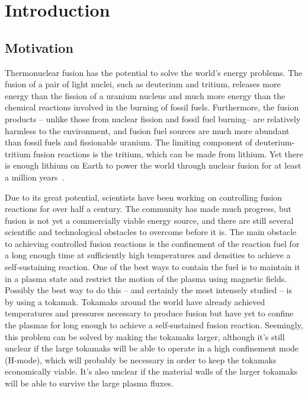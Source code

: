 \chapter{Introduction}
\label{c_intro}

\section{Motivation}
\label{s_motivation}

Thermonuclear fusion has the potential to solve the world's energy problems. The fusion of a pair of light nuclei, such as deuterium and tritium, releases more energy than the fission
of a uranium nucleus and much more energy than the chemical reactions involved in the burning of fossil fuels. Furthermore, the fusion products 
-- unlike those from nuclear fission and fossil fuel burning-- are relatively harmless to the environment, and fusion fuel sources are much more abundant than fossil fuels
and fissionable uranium. The limiting component of deuterium-tritium fusion reactions is the tritium, which can be made from lithium. Yet there is enough lithium on Earth to power the world
through nuclear fusion for at least a million years~\cite{wesson2004}.

Due to its great potential, scientists have been working on controlling fusion reactions for over half a century. The community has made much progress, but fusion is not yet a commercially
viable energy source, and there are still several scientific and technological obstacles to overcome before it is. The main obstacle to achieving controlled fusion reactions is the confinement of the
reaction fuel for a long enough time at sufficiently high temperatures and densities to achieve a self-sustaining reaction. 
One of the best ways to contain the fuel is to maintain it in a plasma state and restrict the motion of the plasma using magnetic fields. 
Possibly the best way to do this -- and certainly the most intensely studied -- is by using a tokamak. Tokamaks around the world have already achieved temperatures and pressures
necessary to produce fusion but have yet to confine the plasmas for long enough to achieve a self-sustained fusion reaction. Seemingly, this problem can be solved by making
the tokamaks larger, although it's still unclear if the large tokamaks will be able to operate in a high confinement mode (H-mode), which will probably be necessary in order to
keep the tokamaks economically viable. It's also unclear if the material walls of the larger tokamaks will be able to survive the large plasma fluxes.

